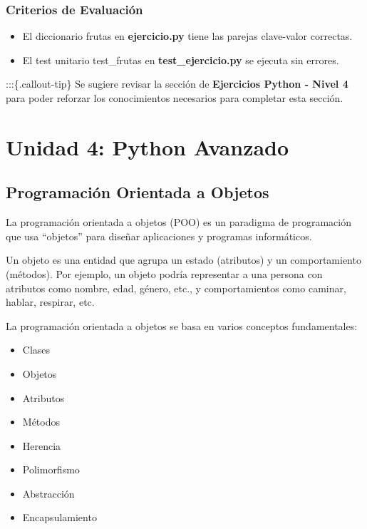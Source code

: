 \documentclass[
  a4paper,
  DIV=11,
  numbers=noendperiod,
  onepage,
  openany]{scrreprt}
\providecommand{\tightlist}{%
  \setlength{\itemsep}{0pt}\setlength{\parskip}{0pt}}\usepackage{longtable,booktabs,array}
\begin{document}
\section{Criterios de Evaluación}\label{criterios-de-evaluaciuxf3n}

\begin{itemize}
\tightlist
\item
  El diccionario frutas en \textbf{ejercicio.py} tiene las parejas
  clave-valor correctas.
\item
  El test unitario test\_frutas en \textbf{test\_ejercicio.py} se
  ejecuta sin errores.
\end{itemize}

:::\{.callout-tip\} Se sugiere revisar la sección de \textbf{Ejercicios
Python - Nivel 4} para poder reforzar los conocimientos necesarios para
completar esta sección.

\part{Unidad 4: Python Avanzado}

\chapter{Programación Orientada a
Objetos}\label{programaciuxf3n-orientada-a-objetos}

La programación orientada a objetos (POO) es un paradigma de
programación que usa ``objetos'' para diseñar aplicaciones y programas
informáticos.

Un objeto es una entidad que agrupa un estado (atributos) y un
comportamiento (métodos). Por ejemplo, un objeto podría representar a
una persona con atributos como nombre, edad, género, etc., y
comportamientos como caminar, hablar, respirar, etc.

La programación orientada a objetos se basa en varios conceptos
fundamentales:

\begin{itemize}
\tightlist
\item
  Clases
\item
  Objetos
\item
  Atributos
\item
  Métodos
\item
  Herencia
\item
  Polimorfismo
\item
  Abstracción
\item
  Encapsulamiento
\end{itemize}
\end{document}
